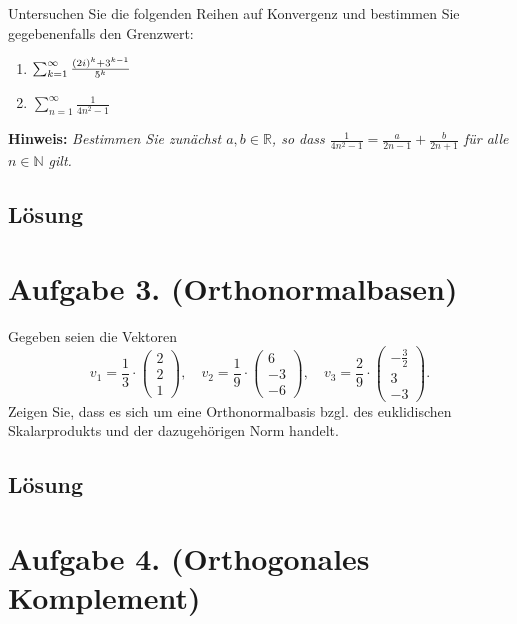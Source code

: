 \documentclass[german,12pt]{homework}
\newcommand{\NN}{\mathbb{N}}
\newcommand{\RR}{\mathbb{R}}
\DeclarePairedDelimiter{\enbrace}{(}{)}
\begin{document}
    \begin{problem}
        Untersuchen Sie die folgenden Reihen auf Konvergenz und bestimmen Sie gegebenenfalls den Grenzwert:
        \begin{enumerate}
            \item \(\sum_{k = 1}^\infty\frac{\enbrace*{2i}^k + 3^{k - 1}}{5^k}\)
            \item \(\sum_{n = 1}^\infty\frac{1}{4n^2 - 1}\)
        \end{enumerate}

        \textbf{Hinweis:} \emph{Bestimmen Sie zunächst \(a, b \in \RR\), so dass \(\frac{1}{4n^2 - 1} = \frac{a}{2n - 1} + \frac{b}{2n + 1}\) für alle \(n \in \NN\) gilt.}
    \end{problem}

    \subsection*{Lösung}

    \section*{Aufgabe 3. (Orthonormalbasen)}

    \begin{problem}
        Gegeben seien die Vektoren
        \[v_1 = \frac{1}{3} \cdot \begin{pmatrix}2\\2\\1\end{pmatrix}, \quad v_2 = \frac{1}{9} \cdot \begin{pmatrix}6\\-3\\-6\end{pmatrix}, \quad v_3 = \frac{2}{9} \cdot \begin{pmatrix}-\frac{3}{2}\\3\\-3\end{pmatrix}.\]
        Zeigen Sie, dass es sich um eine Orthonormalbasis bzgl. des euklidischen Skalarprodukts und der dazugehörigen Norm handelt.
    \end{problem}

    \subsection*{Lösung}

    \section*{Aufgabe 4. (Orthogonales Komplement)}
\end{document}

